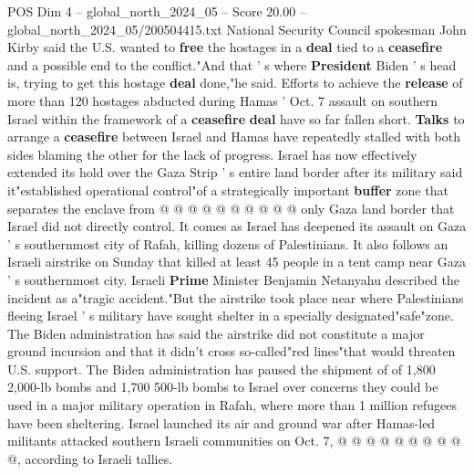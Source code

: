 \begin{textsample}{POS Dim 4 – global\_north\_2024\_05 – Score 20.00 – global\_north\_2024\_05/200504415.txt}
National Security Council spokesman John Kirby said the U.S. wanted to \textbf{free} the hostages in a \textbf{deal} tied to a \textbf{ceasefire} and a possible end to the conflict."And that ' s where \textbf{President} Biden ' s head is, trying to get this hostage \textbf{deal} done,"he said.
Efforts to achieve the \textbf{release} of more than 120 hostages abducted during Hamas ' Oct. 7 assault on southern Israel within the framework of a \textbf{ceasefire} \textbf{deal} have so far fallen short. \textbf{Talks} to arrange a \textbf{ceasefire} between Israel and Hamas have repeatedly stalled with both sides blaming the other for the lack of progress.
Israel has now effectively extended its hold over the Gaza Strip ' s entire land border after its military said it"established operational control"of a strategically important \textbf{buffer} zone that separates the enclave from @ @ @ @ @ @ @ @ @ @ only Gaza land border that Israel did not directly control.
It comes as Israel has deepened its assault on Gaza ' s southernmost city of Rafah, killing dozens of Palestinians.
It also follows an Israeli airstrike on Sunday that killed at least 45 people in a tent camp near Gaza ' s southernmost city.
Israeli \textbf{Prime} Minister Benjamin Netanyahu described the incident as a"tragic accident."But the airstrike took place near where Palestinians fleeing Israel ' s military have sought shelter in a specially designated"safe"zone.
The Biden administration has said the airstrike did not constitute a major ground incursion and that it didn't cross so-called"red lines"that would threaten U.S. support.
The Biden administration has paused the shipment of of 1,800 2,000-lb bombs and 1,700 500-lb bombs to Israel over concerns they could be used in a major military operation in Rafah, where more than 1 million refugees have been sheltering.
Israel launched its air and ground war after Hamas-led militants attacked southern Israeli communities on Oct. 7, @ @ @ @ @ @ @ @ @ @, according to Israeli tallies.

\end{textsample}
